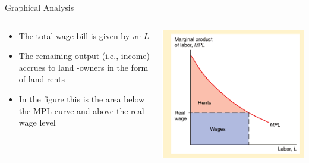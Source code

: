 \documentclass[10pt,hyperref={CJKbookmarks=true},xcolor=dvipsnames,aspectratio=169]{beamer}
\begin{document}
\begin{frame}{Graphical Analysis }


\begin{columns}[onlytextwidth]
\begin{column}{0.4\textwidth}
\begin{itemize}
\item The total wage bill is given by $w\cdot L$ 
\item The remaining output (i.e., income) accrues to land -owners in the
form of land rents 
\item In the figure this is the area below the MPL curve and above the real
wage level
\end{itemize}

\end{column}
\begin{column}{0.6\textwidth}
\includegraphics[width=0.8\columnwidth]{fig/migration/lec4-27}
\end{column}
\end{columns}

\end{frame}
\end{document}
